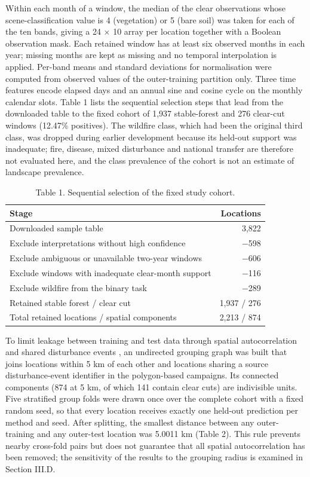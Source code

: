 \documentclass[11pt,a4paper]{article}
\begin{document}
Within each month of a window, the median of the clear observations whose scene-classification value is 4 (vegetation) or 5 (bare soil) was taken for each of the ten bands, giving a 24 $\times$ 10 array per location together with a Boolean observation mask. Each retained window has at least six observed months in each year; missing months are kept as missing and no temporal interpolation is applied. Per-band means and standard deviations for normalisation were computed from observed values of the outer-training partition only. Three time features encode elapsed days and an annual sine and cosine cycle on the monthly calendar slots. Table 1 lists the sequential selection steps that lead from the downloaded table to the fixed cohort of 1,937 stable-forest and 276 clear-cut windows (12.47\% positives). The wildfire class, which had been the original third class, was dropped during earlier development because its held-out support was inadequate; fire, disease, mixed disturbance and national transfer are therefore not evaluated here, and the class prevalence of the cohort is not an estimate of landscape prevalence.

\begin{table}[htbp]
\centering

\caption{Table 1. Sequential selection of the fixed study cohort.}
\begin{tabular}{lr}
\toprule
Stage & Locations \\ \midrule
Downloaded sample table & 3,822 \\
Exclude interpretations without high confidence & $-$598 \\
Exclude ambiguous or unavailable two-year windows & $-$606 \\
Exclude windows with inadequate clear-month support & $-$116 \\
Exclude wildfire from the binary task & $-$289 \\
Retained stable forest / clear cut & 1,937 / 276 \\
Total retained locations / spatial components & 2,213 / 874 \\
\bottomrule
\end{tabular}
\end{table}

To limit leakage between training and test data through spatial autocorrelation and shared disturbance events \cite{ref4,ref21}, an undirected grouping graph was built that joins locations within 5 km of each other and locations sharing a source disturbance-event identifier in the polygon-based campaigns. Its connected components (874 at 5 km, of which 141 contain clear cuts) are indivisible units. Five stratified group folds were drawn once over the complete cohort with a fixed random seed, so that every location receives exactly one held-out prediction per method and seed. After splitting, the smallest distance between any outer-training and any outer-test location was 5.0011 km (Table 2). This rule prevents nearby cross-fold pairs but does not guarantee that all spatial autocorrelation has been removed; the sensitivity of the results to the grouping radius is examined in Section III.D.
\end{document}
